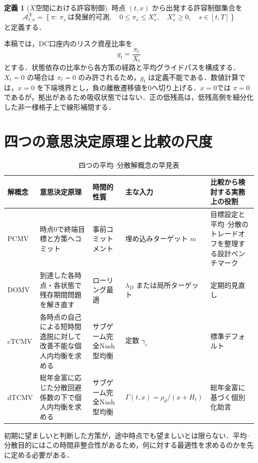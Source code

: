 \documentclass[10pt,a4paper]{article}
\theoremstyle{plain}
\theoremstyle{definition}
\newtheorem{definition}{定義}
\newcommand{\A}{\mathcal{A}}
\begin{document}
\begin{definition}[$X$空間における許容制御]
時点 $(t,x)$ から出発する許容制御集合を
\begin{equation}
  \A^X_{t,x}
  =
  \left\{
  \pi:\ \pi_s\ \text{は発展的可測},\quad
  0\leq\pi_s\leq X_s^\pi,\quad X_s^\pi\geq0,\quad s\in[t,T]
  \right\}
  \label{eq:admissible-X}
\end{equation}
と定義する．
\end{definition}

本稿では，DC口座内のリスク資産比率を
\begin{equation}
  g_t=\frac{\pi_t}{X_t}
  \label{eq:glidepath-def}
\end{equation}
とする．状態依存の比率から各方策の経路と平均グライドパスを構成する．$X_t=0$ の場合は $\pi_t=0$ のみ許されるため，$g_t$ は定義不能である．数値計算では，$x=0$ を下端境界とし，負の離散遷移値を0へ切り上げる．$x=0$では $\pi=0$ であるが，拠出があるため吸収状態ではない．正の低残高は，低残高側を細分化した非一様格子上で線形補間する．




\section{四つの意思決定原理と比較の尺度}\label{sec:principles-main}
\begin{table}[htbp]
\centering
\scriptsize
\caption{四つの平均--分散解概念の早見表}
\label{tab:four-concepts-guide}
\begin{tabularx}{\textwidth}{p{16mm}p{39mm}p{25mm}p{28mm}X}
\toprule
解概念 & 意思決定原理 & 時間的性質 & 主な入力 & 比較から検討する実務上の役割 \\
\midrule
PCMV & 時点0で終端目標と方策へコミット & 事前コミットメント & 埋め込みターゲット $m$ & 目標設定と平均--分散のトレードオフを整理する設計ベンチマーク \\
DOMV & 到達した各時点・各状態で残存期間問題を解き直す & ローリング最適 & $\lambda_D$ または局所ターゲット & 定期的見直し \\
cTCMV & 各時点の自己による短時間逸脱に対して改善不能な個人内均衡を求める & サブゲーム完全Nash型均衡 & 定数 $\gamma_c$ & 標準デフォルト \\
dTCMV & 総年金富に応じた分散回避係数の下で個人内均衡を求める & サブゲーム完全Nash型均衡 & $\Gamma(t,x)=\rho_d/(x+H_t)$ & 総年金富に基づく個別化助言 \\
\bottomrule
\end{tabularx}
\end{table}
初期に望ましいと判断した方策が，途中時点でも望ましいとは限らない．平均--分散目的にはこの時間非整合性があるため，何に対する最適性を求めるのかを先に定める必要がある．
\end{document}
